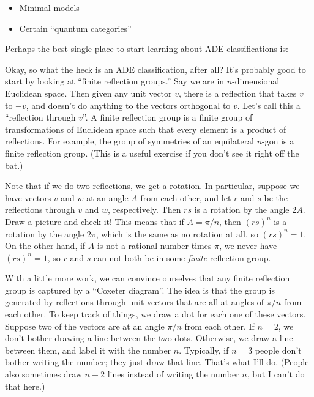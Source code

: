 \documentclass{article}
\def\tightlist{}
\renewcommand{\texttt}[1]{%
  \begingroup
  \ttfamily
  \begingroup\lccode`~=`/\lowercase{\endgroup\def~}{/\discretionary{}{}{}}%
  \begingroup\lccode`~=`[\lowercase{\endgroup\def~}{[\discretionary{}{}{}}%
  \begingroup\lccode`~=`.\lowercase{\endgroup\def~}{.\discretionary{}{}{}}%
  \catcode`/=\active\catcode`[=\active\catcode`.=\active
  \scantokens{#1\noexpand}%
  \endgroup
}
\begin{document}
\begin{itemize}
\tightlist
\item
  Minimal models
\item
  Certain ``quantum categories''
\end{itemize}

Perhaps the best single place to start learning about ADE
classifications is:


Okay, so what the heck is an ADE classification, after all? It's
probably good to start by looking at ``finite reflection groups.'' Say
we are in \(n\)-dimensional Euclidean space. Then given any unit vector
\(v\), there is a reflection that takes \(v\) to \(-v\), and doesn't do
anything to the vectors orthogonal to \(v\). Let's call this a
``reflection through \(v\)''. A finite reflection group is a finite
group of transformations of Euclidean space such that every element is a
product of reflections. For example, the group of symmetries of an
equilateral \(n\)-gon is a finite reflection group. (This is a useful
exercise if you don't see it right off the bat.)

Note that if we do two reflections, we get a rotation. In particular,
suppose we have vectors \(v\) and \(w\) at an angle \(A\) from each
other, and let \(r\) and \(s\) be the reflections through \(v\) and
\(w\), respectively. Then \(rs\) is a rotation by the angle \(2A\). Draw
a picture and check it! This means that if \(A = \pi / n\), then
\((rs)^n\) is a rotation by the angle \(2\pi\), which is the same as no
rotation at all, so \((rs)^n = 1\). On the other hand, if \(A\) is not a
rational number times \(\pi\), we never have \((rs)^n = 1\), so \(r\)
and \(s\) can not both be in some \emph{finite} reflection group.

With a little more work, we can convince ourselves that any finite
reflection group is captured by a ``Coxeter diagram''. The idea is that
the group is generated by reflections through unit vectors that are all
at angles of \(\pi/n\) from each other. To keep track of things, we draw
a dot for each one of these vectors. Suppose two of the vectors are at
an angle \(\pi/n\) from each other. If \(n = 2\), we don't bother
drawing a line between the two dots. Otherwise, we draw a line between
them, and label it with the number \(n\). Typically, if \(n = 3\) people
don't bother writing the number; they just draw that line. That's what
I'll do. (People also sometimes draw \(n - 2\) lines instead of writing
the number \(n\), but I can't do that here.)
\end{document}
